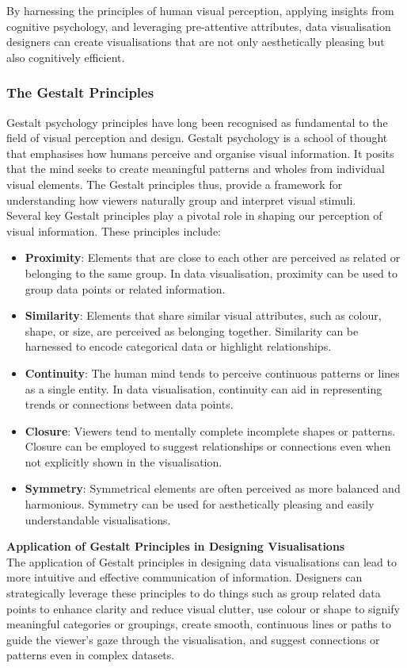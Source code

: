 \documentclass{article}\usepackage[]{graphicx}\usepackage[]{xcolor}
\begin{document}
By harnessing the principles of human visual perception, applying insights from cognitive psychology, and leveraging pre-attentive attributes, data visualisation designers can create visualisations that are not only aesthetically pleasing but also cognitively efficient.	

\subsubsection{The Gestalt Principles}
Gestalt psychology principles have long been recognised as fundamental to the field of visual perception and design. Gestalt psychology is a school of thought that emphasises how humans perceive and organise visual information. It posits that the mind seeks to create meaningful patterns and wholes from individual visual elements. The Gestalt principles thus, provide a framework for understanding how viewers naturally group and interpret visual stimuli.\\

Several key Gestalt principles play a pivotal role in shaping our perception of visual information. These principles include: 
\begin{itemize}
    \item \textbf{Proximity}: Elements that are close to each other are perceived as related or belonging to the same group. In data visualisation, proximity can be used to group data points or related information.
    \item \textbf{Similarity}: Elements that share similar visual attributes, such as colour, shape, or size, are perceived as belonging together. Similarity can be harnessed to encode categorical data or highlight relationships. 
    \item \textbf{Continuity}: The human mind tends to perceive continuous patterns or lines as a single entity. In data visualisation, continuity can aid in representing trends or connections between data points.
    \item \textbf{Closure}: Viewers tend to mentally complete incomplete shapes or patterns. Closure can be employed to suggest relationships or connections even when not explicitly shown in the visualisation.
    \item \textbf{Symmetry}: Symmetrical elements are often perceived as more balanced and harmonious. Symmetry can be used for aesthetically pleasing and easily understandable visualisations.
\end{itemize}

\textbf{Application of Gestalt Principles in Designing Visualisations}\\
The application of Gestalt principles in designing data visualisations can lead to more intuitive and effective communication of information. Designers can strategically leverage these principles to do things such as group related data points to enhance clarity and reduce visual clutter, use colour or shape to signify meaningful categories or groupings, create smooth, continuous lines or paths to guide the viewer's gaze through the visualisation, and suggest connections or patterns even in complex datasets.
\end{document}
